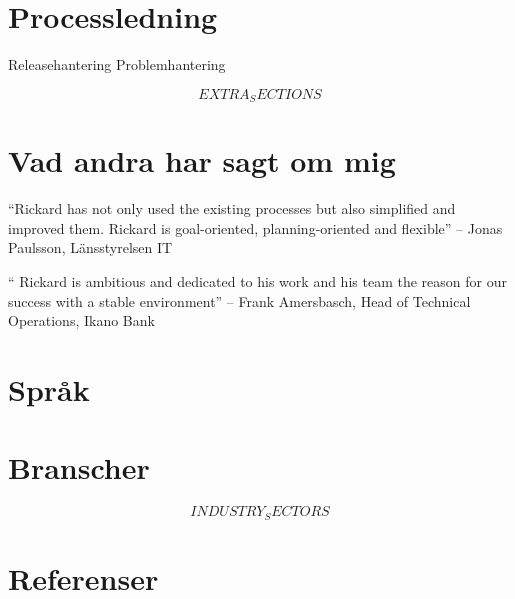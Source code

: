 \documentclass[11pt,a4paper,sans]{moderncv}
\begin{document}

\section{Processledning}
 {Releasehantering}
 {Problemhantering}

$$EXTRA_SECTIONS$$



\section{Vad andra har sagt om mig}

\begin{quotelist}
\item  ``Rickard has not only used the existing processes but also simplified and improved them.
        Rickard is goal-oriented, planning-oriented and flexible''  -- Jonas Paulsson, L\"ansstyrelsen IT
\item
        `` Rickard is ambitious and dedicated to his work and his team the reason for our success with a stable environment''  -- Frank Amersbasch, Head of Technical Operations, Ikano Bank
  \end{quotelist}

\section{Spr\aa k}

\section{Branscher}
$$INDUSTRY_SECTORS$$

\section{Referenser}

\nocite{*}

\clearpage
\Large
\end{document}
